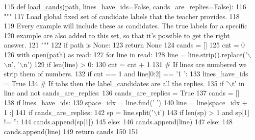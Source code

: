 \begin{DoxyCode}
115 \textcolor{keyword}{def }\hyperlink{namespaceparlai_1_1utils_1_1misc_ad935ab0a9d49b897c5e3efdbe1c46c4d}{load\_cands}(path, lines\_have\_ids=False, cands\_are\_replies=False):
116     \textcolor{stringliteral}{"""}
117 \textcolor{stringliteral}{    Load global fixed set of candidate labels that the teacher provides.}
118 \textcolor{stringliteral}{}
119 \textcolor{stringliteral}{    Every example will include these as candidates. The true labels for a specific}
120 \textcolor{stringliteral}{    example are also added to this set, so that it's possible to get the right answer.}
121 \textcolor{stringliteral}{    """}
122     \textcolor{keywordflow}{if} path \textcolor{keywordflow}{is} \textcolor{keywordtype}{None}:
123         \textcolor{keywordflow}{return} \textcolor{keywordtype}{None}
124     cands = []
125     cnt = 0
126     with open(path) \textcolor{keyword}{as} read:
127         \textcolor{keywordflow}{for} line \textcolor{keywordflow}{in} read:
128             line = line.strip().replace(\textcolor{stringliteral}{'\(\backslash\)\(\backslash\)n'}, \textcolor{stringliteral}{'\(\backslash\)n'})
129             \textcolor{keywordflow}{if} len(line) > 0:
130                 cnt = cnt + 1
131                 \textcolor{comment}{# If lines are numbered we strip them of numbers.}
132                 \textcolor{keywordflow}{if} cnt == 1 \textcolor{keywordflow}{and} line[0:2] == \textcolor{stringliteral}{'1 '}:
133                     lines\_have\_ids = \textcolor{keyword}{True}
134                 \textcolor{comment}{# If tabs then the label\_candidates are all the replies.}
135                 \textcolor{keywordflow}{if} \textcolor{stringliteral}{'\(\backslash\)t'} \textcolor{keywordflow}{in} line \textcolor{keywordflow}{and} \textcolor{keywordflow}{not} cands\_are\_replies:
136                     cands\_are\_replies = \textcolor{keyword}{True}
137                     cands = []
138                 \textcolor{keywordflow}{if} lines\_have\_ids:
139                     space\_idx = line.find(\textcolor{stringliteral}{' '})
140                     line = line[space\_idx + 1 :]
141                     \textcolor{keywordflow}{if} cands\_are\_replies:
142                         sp = line.split(\textcolor{stringliteral}{'\(\backslash\)t'})
143                         \textcolor{keywordflow}{if} len(sp) > 1 \textcolor{keywordflow}{and} sp[1] != \textcolor{stringliteral}{''}:
144                             cands.append(sp[1])
145                     \textcolor{keywordflow}{else}:
146                         cands.append(line)
147                 \textcolor{keywordflow}{else}:
148                     cands.append(line)
149     \textcolor{keywordflow}{return} cands
150 
151 
\end{DoxyCode}
\mbox{\label{namespaceparlai_1_1utils_1_1misc_ac8ca45e62ca906d9b6e5026588a5d2a2}} 
